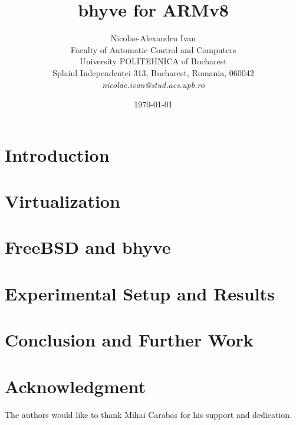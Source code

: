 \documentclass[12pt]{article}
\title{bhyve for ARMv8}
\author{Nicolae-Alexandru Ivan\\
Faculty of Automatic Control and Computers\\
University POLITEHNICA of Bucharest\\
Splaiul Independenței 313, Bucharest, Romania, 060042 \\
\emph{nicolae.ivan@stud.acs.upb.ro}}
\date{\today}
\begin{document}
\maketitle

\begin{abstract}

\end{abstract}

\section{Introduction}
\label{sec:introduction}


\section{Virtualization}
\label{sec:virtualization}


\section{FreeBSD and bhyve}
\label{sec:bhyve}


\section{Experimental Setup and Results}
\label{sec:setup}


\section{Conclusion and Further Work}
\label{sec:conclusion}


\section*{Acknowledgment}
\label{sec:acknowledgment}

The authors would like to thank Mihai Carabaș for his support and dedication.

\nocite{*}



\end{document}
